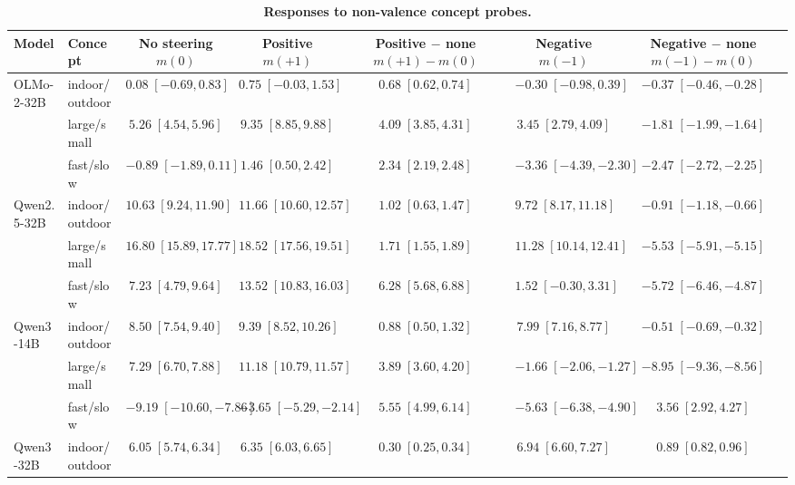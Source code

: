 \begin{table}[!htbp]
\centering
\caption{\textbf{Responses to non-valence concept probes.}}
\label{tab:concept_probe}
\fontsize{6}{8}\selectfont
\setlength{\tabcolsep}{2pt}
\begin{tabular*}{\textwidth}{@{\extracolsep{\fill}}llccccc@{}}
\toprule
Model & Concept & \shortstack{No steering\\$m(0)$} & \shortstack{Positive\\$m(+1)$} & \shortstack{Positive $-$ none\\$m(+1)-m(0)$} & \shortstack{Negative\\$m(-1)$} & \shortstack{Negative $-$ none\\$m(-1)-m(0)$} \\
\midrule
OLMo-2-32B & indoor/outdoor & $0.08\;[-0.69, 0.83]$ & $0.75\;[-0.03, 1.53]$ & $0.68\;[0.62, 0.74]$ & $-0.30\;[-0.98, 0.39]$ & $-0.37\;[-0.46, -0.28]$ \\
 & large/small & $5.26\;[4.54, 5.96]$ & $9.35\;[8.85, 9.88]$ & $4.09\;[3.85, 4.31]$ & $3.45\;[2.79, 4.09]$ & $-1.81\;[-1.99, -1.64]$ \\
 & fast/slow & $-0.89\;[-1.89, 0.11]$ & $1.46\;[0.50, 2.42]$ & $2.34\;[2.19, 2.48]$ & $-3.36\;[-4.39, -2.30]$ & $-2.47\;[-2.72, -2.25]$ \\
\addlinespace
Qwen2.5-32B & indoor/outdoor & $10.63\;[9.24, 11.90]$ & $11.66\;[10.60, 12.57]$ & $1.02\;[0.63, 1.47]$ & $9.72\;[8.17, 11.18]$ & $-0.91\;[-1.18, -0.66]$ \\
 & large/small & $16.80\;[15.89, 17.77]$ & $18.52\;[17.56, 19.51]$ & $1.71\;[1.55, 1.89]$ & $11.28\;[10.14, 12.41]$ & $-5.53\;[-5.91, -5.15]$ \\
 & fast/slow & $7.23\;[4.79, 9.64]$ & $13.52\;[10.83, 16.03]$ & $6.28\;[5.68, 6.88]$ & $1.52\;[-0.30, 3.31]$ & $-5.72\;[-6.46, -4.87]$ \\
\addlinespace
Qwen3-14B & indoor/outdoor & $8.50\;[7.54, 9.40]$ & $9.39\;[8.52, 10.26]$ & $0.88\;[0.50, 1.32]$ & $7.99\;[7.16, 8.77]$ & $-0.51\;[-0.69, -0.32]$ \\
 & large/small & $7.29\;[6.70, 7.88]$ & $11.18\;[10.79, 11.57]$ & $3.89\;[3.60, 4.20]$ & $-1.66\;[-2.06, -1.27]$ & $-8.95\;[-9.36, -8.56]$ \\
 & fast/slow & $-9.19\;[-10.60, -7.86]$ & $-3.65\;[-5.29, -2.14]$ & $5.55\;[4.99, 6.14]$ & $-5.63\;[-6.38, -4.90]$ & $\boldsymbol{3.56\;[2.92, 4.27]}$ \\
\addlinespace
Qwen3-32B & indoor/outdoor & $6.05\;[5.74, 6.34]$ & $6.35\;[6.03, 6.65]$ & $0.30\;[0.25, 0.34]$ & $6.94\;[6.60, 7.27]$ & $\boldsymbol{0.89\;[0.82, 0.96]}$ \\

\end{tabular*}
\end{table}
